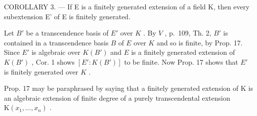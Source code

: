COROLLARY 3. --- If E is a finitely generated extension of a field K, then every subextension E' of E is finitely generated.

Let \(B'\) be a transcendence basis of \(E'\) over \(K\) . By \(V\) , p.~109, Th. 2, \(B'\) is contained in a transcendence basis \(B\) of \(E\) over \(K\) and so is finite, by Prop. 17. Since \(E'\) is algebraic over \(K(B')\) and \(E\) is a finitely generated extension of \(K(B')\) , Cor. 1 shows \([E': K(B')]\) to be finite. Now Prop. 17 shows that \(E'\) is finitely generated over \(K\) .

Prop. 17 may be paraphrased by saying that a finitely generated extension of K is an algebraic extension of finite degree of a purely transcendental extension \(\mathrm{K}(x_{1},\ldots,x_{n})\) .


